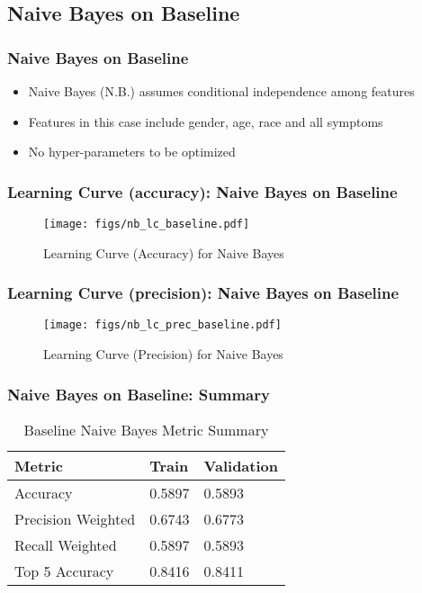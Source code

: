 \documentclass{beamer}
\begin{document}
\subsection{Naive Bayes on Baseline} %
\begin{frame}
\frametitle{Naive Bayes on Baseline}
\begin{itemize}
	\item Naive Bayes (N.B.) assumes conditional independence among features
	\item Features in this case include gender, age, race and all symptoms
	\item No hyper-parameters to be optimized
\end{itemize}
\end{frame}

\begin{frame}
\frametitle{Learning Curve (accuracy): Naive Bayes on Baseline}
\begin{figure}
	\texttt{[image: figs/nb\_lc\_baseline.pdf]}
	\caption{Learning Curve (Accuracy) for Naive Bayes}
\end{figure}
\end{frame}

\begin{frame}
\frametitle{Learning Curve (precision): Naive Bayes on Baseline}
\begin{figure}
	\texttt{[image: figs/nb\_lc\_prec\_baseline.pdf]}
	\caption{Learning Curve (Precision) for Naive Bayes}
\end{figure}
\end{frame}

\begin{frame}
\frametitle{Naive Bayes on Baseline: Summary }
\begin{table}[]
	\begin{tabular}{|l|l|l|}
		\hline
		Metric               & Train  & Validation \\ \hline
		Accuracy             & 0.5897 & 0.5893     \\ \hline
		Precision Weighted   & 0.6743 & 0.6773     \\ \hline
		Recall Weighted      & 0.5897 & 0.5893     \\ \hline
		Top 5 Accuracy       & 0.8416 & 0.8411     \\ \hline
	\end{tabular}
	\caption{Baseline Naive Bayes Metric Summary}
	\label{table:tab_1}
\end{table}
\end{frame}
\end{document}
